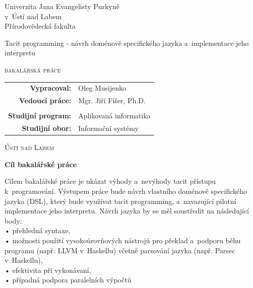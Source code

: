 \documentclass[male, czech]{kithesis}
\newcommand{\AUTOR}{Oleg Musijenko}
\newcommand{\TITULcz}{Tacit programming - návrh doménově specifického jazyka a~implementace jeho interpretu} %
\newcommand{\VEDOUCI}{Mgr. Jiří Fišer, Ph.D.}
\newcommand{\PROGRAM}{Aplikovaná informatika}
\newcommand{\OBOR}{Informační systémy}
\begin{document}
\thispagestyle{empty}
\begin{center}
{\Huge Univerzita Jana Evangelisty Purkyně \\
v~Ústí nad Labem}
\\[16pt]
{\huge Přírodovědecká fakulta}

\vspace{2cm}

\vspace{2cm}
{
\huge
\TITULcz\par

\vspace{0.5em}
\LARGE\scshape bakalářská práce
}
\end{center} 
 
\vfill
{
\large
\begin{tabular}{>{\bfseries}rl}
    Vypracoval: 	& \AUTOR\\
    Vedoucí práce: 	& \VEDOUCI\\
&\\
Studijní program:       & \PROGRAM\\
Studijní obor:          & \OBOR\\
\end{tabular} 
}
\vspace{1.5cm}
\begin{center}
\Large\scshape   Ústí nad Labem \the\year
\end{center}

\cleardoublepage
\thispagestyle{empty}

\textbf{\textsf{Cíl bakalářské práce}}

Cílem bakalářské práce je ukázat výhody a~nevýhody tacit přístupu k~programování. Výstupem práce bude návrh vlastního doménově specifického jazyka (DSL), který
bude využívat tacit programming, a~navazující pilotní implementace jeho interpretu.
Návrh jazyka by se měl soustředit na následující body:\\
• přehledná syntaxe,\\
• možnosti použití vysokoúrovňových nástrojů pro překlad a~podporu běhu programu (např. LLVM v~Haskellu) včetně parsování jazyka (např. Parsec v~Haskellu),\\
• efektivita při vykonávaní,\\
• případná podpora paralelních výpočtů
\end{document}
